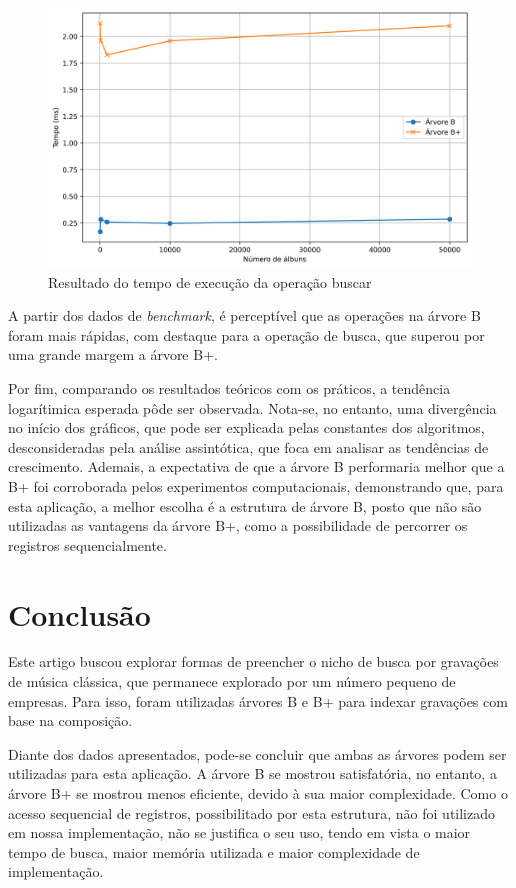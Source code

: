 \documentclass[12pt]{article}
\begin{document}
\begin{figure}[ht]
\centering
\includegraphics[width=1\textwidth]{figuras/graph_search.png}
\caption{Resultado do tempo de execução da operação buscar}
\label{fig:graph_search}
\end{figure}

A partir dos dados de \emph{benchmark}, é perceptível que as operações na árvore B
foram mais rápidas, com destaque para a operação de busca, que superou por uma 
grande margem a árvore B+.

Por fim, comparando os resultados teóricos com os práticos, a tendência logarítimica
esperada pôde ser observada.
Nota-se, no entanto, uma divergência no início dos gráficos, que pode ser explicada
pelas constantes dos algoritmos, desconsideradas pela análise assintótica, que
foca em analisar as tendências de crescimento.
Ademais, a expectativa de que a árvore B performaria melhor que a B+ foi corroborada
pelos experimentos computacionais, demonstrando que, para esta aplicação, a
melhor escolha é a estrutura de árvore B, posto que não são utilizadas as 
vantagens da árvore B+, como a possibilidade de percorrer os registros sequencialmente.

\section{Conclusão} \label{sec:conclusion}
Este artigo buscou explorar formas de preencher o nicho de busca por gravações
de música clássica, que permanece explorado por um número pequeno de empresas.
Para isso, foram utilizadas árvores B e B+ para indexar gravações com base na
composição.

Diante dos dados apresentados, pode-se concluir que ambas as árvores podem ser
utilizadas para esta aplicação.
A árvore B se mostrou satisfatória, no entanto, a árvore B+ se mostrou menos
eficiente, devido à sua maior complexidade.
Como o acesso sequencial de registros, possibilitado por esta estrutura, não foi
utilizado em nossa implementação, não se justifica o seu uso, tendo em vista o
maior tempo de busca, maior memória utilizada e maior complexidade de implementação.
\end{document}
